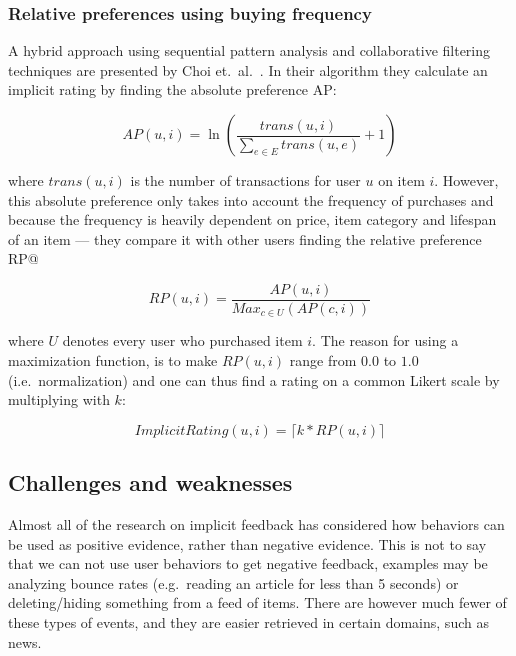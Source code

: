 
\subsubsection{Relative preferences using buying frequency}

A hybrid approach using sequential pattern analysis and collaborative filtering
techniques are presented by Choi et.\ al.~\cite{choi2012hybrid}. In their
algorithm they calculate an implicit rating by finding the absolute preference
AP\@:

\begin{equation}
  AP(u,i) = \ln(\frac{trans(u,i)}{\sum_{e \in E}{trans(u, e)}} + 1)
\end{equation}


where $trans(u,i)$ is the number of transactions for user $u$ on item $i$.
However, this absolute preference only takes into account the frequency of
purchases and because the frequency is heavily dependent on price, item
category and lifespan of an item — they compare it with other users finding the
relative preference RP@\:

\begin{equation}
  RP(u,i) = \frac{AP(u,i)}{Max_{c \in U}(AP(c,i))}
\end{equation}

where $U$ denotes every user who purchased item $i$. The reason for using a
maximization function, is to make $RP(u,i)$ range from $0.0$ to $1.0$ (i.e.\
normalization) and one can thus find a rating on a common Likert scale by
multiplying with $k$:

\begin{equation}
  ImplicitRating(u,i) = \lceil k * RP(u,i) \rceil
\end{equation}


\subsection{Challenges and weaknesses}
\label{implicit-weaknesses}

Almost all of the research on implicit feedback has considered how behaviors
can be used as positive evidence, rather than negative evidence. This is not to
say that we can not use user behaviors to get negative feedback, examples may
be analyzing bounce rates (e.g.\ reading an article for less than 5 seconds) or
deleting/hiding something from a feed of items. There are however much fewer of
these types of events, and they are easier retrieved in certain domains, such
as news.

